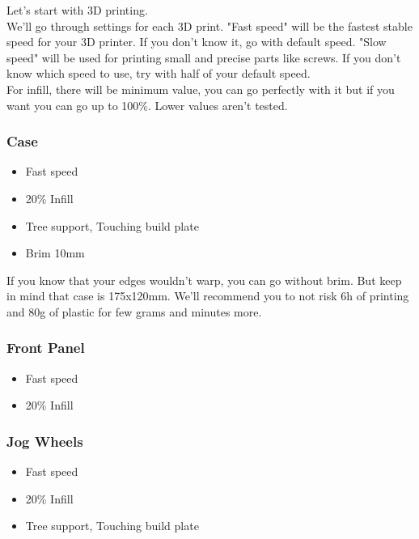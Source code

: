 \documentclass[12pt, a4paper]{article}
\begin{document}
			\noindent Let's start with 3D printing. \\
			
			\noindent We'll go through settings for each 3D print. "Fast speed" will be the fastest stable speed for your 3D printer. If you don't know it, go with default speed. "Slow speed" will be used for printing small and precise parts like screws. If you don't know which speed to use, try with half of your default speed. \\
			
			\noindent For infill, there will be minimum value, you can go perfectly with it but if you want you can go up to 100\%. Lower values aren't tested.  \\
	
			
			\subsubsection{Case}
				\begin{itemize}
					\item Fast speed
					\item 20\% Infill
					\item Tree support, Touching build plate
					\item Brim 10mm 
				\end{itemize}
				
				\noindent If you know that your edges wouldn't warp, you can go without brim. But keep in mind that case is 175x120mm. We'll recommend you to not risk 6h of printing and 80g of plastic for few grams and minutes more.
				
			\subsubsection{Front Panel}
				\begin{itemize}
					\item Fast speed
					\item 20\% Infill
				\end{itemize}
				
			\subsubsection{Jog Wheels}
				\begin{itemize}
					\item Fast speed
					\item 20\% Infill
					\item Tree support, Touching build plate
				\end{itemize}
				
\end{document}
